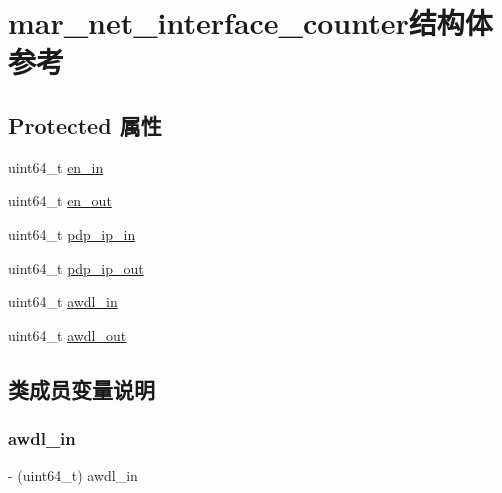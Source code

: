 \hypertarget{structmar__net__interface__counter}{}\section{mar\+\_\+net\+\_\+interface\+\_\+counter结构体 参考}
\label{structmar__net__interface__counter}
\subsection*{Protected 属性}
\begin{DoxyCompactItemize}
\item 
uint64\+\_\+t \hyperlink{structmar__net__interface__counter_a4528312434d8b41a071a4312ea2ddc54}{en\+\_\+in}
\item 
uint64\+\_\+t \hyperlink{structmar__net__interface__counter_af642724f24cb212fb107a85bf972e388}{en\+\_\+out}
\item 
uint64\+\_\+t \hyperlink{structmar__net__interface__counter_a3685121b5a58ac800e0a65550251bafc}{pdp\+\_\+ip\+\_\+in}
\item 
uint64\+\_\+t \hyperlink{structmar__net__interface__counter_ad2bec92e54bba0f70d4f97912c8b9001}{pdp\+\_\+ip\+\_\+out}
\item 
uint64\+\_\+t \hyperlink{structmar__net__interface__counter_a41d43f2700c2dbe38336698f409a3fab}{awdl\+\_\+in}
\item 
uint64\+\_\+t \hyperlink{structmar__net__interface__counter_a4d1b498c84d397626a891f7f324d40d2}{awdl\+\_\+out}
\end{DoxyCompactItemize}


\subsection{类成员变量说明}
\mbox{\label{structmar__net__interface__counter_a41d43f2700c2dbe38336698f409a3fab}} 
\subsubsection{\texorpdfstring{awdl\+\_\+in}{awdl\_in}}
{\footnotesize\ttfamily -\/ (uint64\+\_\+t) awdl\+\_\+in\hspace{0.3cm}{\ttfamily [protected]}}

